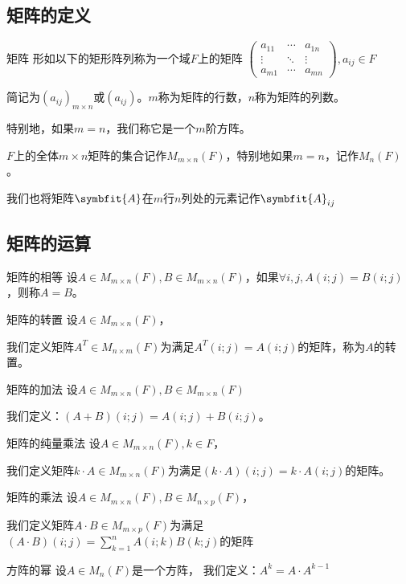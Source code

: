 \documentclass[12pt, a4paper, oneside, UTF8]{ctexbook}
\begin{document}
		\subsection{矩阵的定义}
			\begin{defn}{矩阵}{}
				形如以下的矩形阵列称为一个域$F$上的矩阵
				$\begin{pmatrix}
					a_{11} & \cdots & a_{1n} \\
					\vdots & \ddots & \vdots \\
					a_{m1} & \cdots & a_{mn}
				\end{pmatrix},a_{ij} \in F$

				简记为$(a_{ij})_{m \times n}$或$(a_{ij})$。$m$称为矩阵的行数，$n$称为矩阵的列数。

				特别地，如果$m=n$，我们称它是一个$m$阶方阵。

				$F$上的全体$m \times n$矩阵的集合记作$M_{m \times n} (F)$，特别地如果$m=n$，记作$M_n (F)$。

				我们也将矩阵$\symbfit{A}$在$m$行$n$列处的元素记作$\symbfit{A}_{ij}$
			\end{defn}
		\subsection{矩阵的运算}
		\begin{para}{0}
			    \begin{defn}{矩阵的相等}{}
				    设$A\in M_{m\times n}(F),B\in M_{m \times n}(F)$，如果$\forall i,j,A(i;j)=B(i;j)$，则称$A=B$。
				\end{defn}
				\begin{defn}{矩阵的转置}{}
				    设$A\in M_{m \times n}(F)$，
					
					我们定义矩阵$A^T \in M_{n \times m}(F)$为满足$A^T(i;j)=A(i;j)$的矩阵，称为$A$的转置。
				\end{defn}
				\begin{defn}{矩阵的加法}{}
				    设$A\in M_{m \times n}(F),B\in M_{m \times n}(F)$
					
					我们定义：$(A+B)(i;j)=A(i;j)+B(i;j)$。
				\end{defn}
				\begin{defn}{矩阵的纯量乘法}{}
				    设$A\in M_{m \times n}(F),k \in F$，
					
					我们定义矩阵$k\cdot A \in M_{m\times n}(F)$为满足$(k\cdot  A)(i;j)=k\cdot A(i;j)$的矩阵。
				\end{defn}
				\begin{defn}{矩阵的乘法}{}
				    设$A\in M_{m\times n}(F),B\in M_{n \times p}(F)$，
					
					我们定义矩阵$A\cdot B \in M_{m\times p}(F)$为满足$(A\cdot B)(i;j)=\sum_{k=1}^n A(i;k)B(k;j)$的矩阵
				\end{defn}
				\begin{defn}{方阵的幂}{}
					设$A \in M_n (F)$是一个方阵，
					我们定义：$A^k=A\cdot A^{k-1}$
				\end{defn}
		\end{para}
\end{document}
